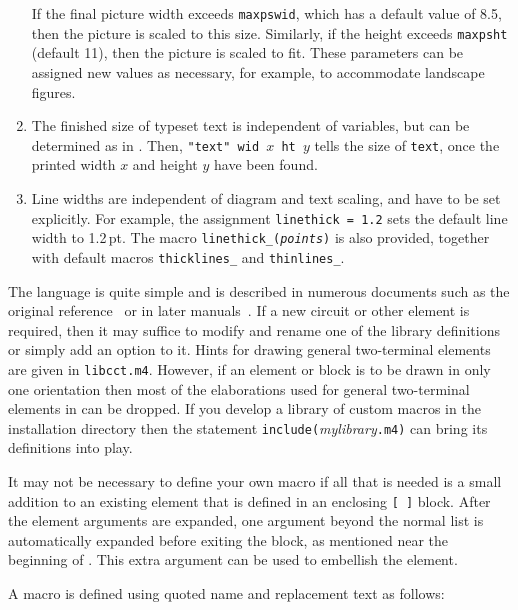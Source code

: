 \begin{enumerate}
  If the final picture width exceeds {\tt maxpswid}, which
  has a default value of 8.5, then the picture is scaled to this size.
  Similarly, if the height exceeds {\tt maxpsht} (default 11), then the
  picture is scaled to fit.  These parameters can be assigned
  new values as necessary, for example, to accommodate landscape figures.

\item The finished size of typeset text is independent of \pic variables,
  but can be determined as in .  Then,
  {\tt "text" wid $x$ ht $y$} tells \pic the size of {\tt text},
  once the printed width $x$ and height $y$ have been found.

\item Line widths are independent of diagram and text scaling, and have
  to be set explicitly.  For example,
  the assignment {\tt linethick = 1.2} sets the default line width to 1.2\,pt.
  The macro {\tt linethick\_({\sl points})} is also provided, together
  with default macros {\tt thicklines\_} and {\tt thinlines\_}.

\end{enumerate}

The \Mfour language is quite simple and is
described in numerous documents such as the original reference~\cite{KRm4}
or in later manuals~\cite{Seindal94}.  If a new circuit
or other element is required, then it may suffice to modify and rename one of
the library definitions or simply add an option to it.
Hints for drawing general two-terminal elements are given in
{\tt libcct.m4}.  However, if an element or block is to be drawn in
only one orientation then most of the elaborations used for general
two-terminal elements in  can be dropped.
If you develop a library of custom macros in the installation
directory then the statement {\tt include(}{\sl mylibrary}{\tt.m4)}
can bring its definitions into play.

It may not be necessary to define your own macro if all that is needed is
a small addition to an existing element that is defined in an enclosing
\verb|[ ]| block.  After the element arguments are expanded,
one argument beyond the normal list is automatically expanded before
exiting the block, as mentioned near the beginning of .
This extra argument can be used to embellish the element.  

A macro is defined using quoted name and replacement text as follows:

